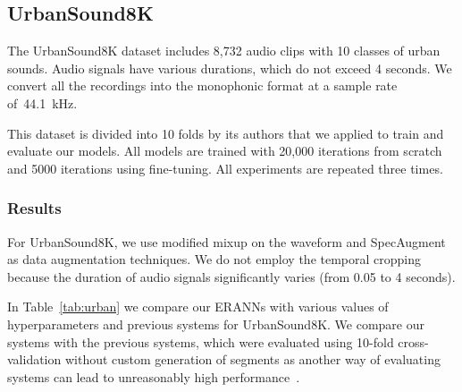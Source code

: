 \documentclass{article}
\begin{document}
\begin{sloppy}
\subsection{UrbanSound8K}

The UrbanSound8K dataset includes 8,732 audio clips with 10 classes of urban sounds. Audio signals have various durations, which do not exceed 4 seconds. We convert all the recordings into the monophonic format at a sample rate of~44.1~kHz.

This dataset is divided into 10 folds by its authors that we applied to train and evaluate our models. All models are trained with 20,000 iterations from scratch and 5000 iterations using fine-tuning. All experiments are repeated three times.


\subsubsection{Results}

For UrbanSound8K, we use modified mixup on the waveform and SpecAugment as data augmentation techniques. We do not employ the temporal cropping because the duration of audio signals significantly varies (from 0.05 to 4 seconds).

In Table~\ref{tab:urban} we compare our ERANNs with various values of hyperparameters and previous systems for UrbanSound8K. We compare our systems with the previous systems, which were evaluated using 10-fold cross-validation without custom generation of segments as another way of evaluating systems can lead to unreasonably high performance~\cite{9413035}.


\end{sloppy}
\end{document}
